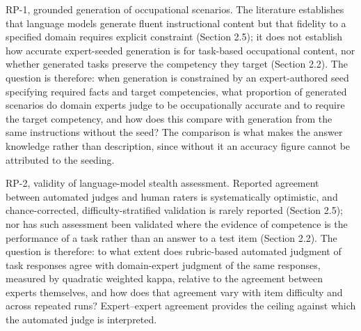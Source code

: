 RP-1, grounded generation of occupational scenarios. The literature establishes that language models generate fluent instructional content but that fidelity to a specified domain requires explicit constraint (Section 2.5); it does not establish how accurate expert-\allowbreak{}seeded generation is for task-based occupational content, nor whether generated tasks preserve the competency they target (Section 2.2). The question is therefore: when generation is constrained by an expert-\allowbreak{}authored seed specifying required facts and target competencies, what proportion of generated scenarios do domain experts judge to be occupationally accurate and to require the target competency, and how does this compare with generation from the same instructions without the seed? The comparison is what makes the answer knowledge rather than description, since without it an accuracy figure cannot be attributed to the seeding.

RP-2, validity of language-\allowbreak{}model stealth assessment. Reported agreement between automated judges and human raters is systematically optimistic, and chance-\allowbreak{}corrected, difficulty-\allowbreak{}stratified validation is rarely reported (Section 2.5); nor has such assessment been validated where the evidence of competence is the performance of a task rather than an answer to a test item (Section 2.2). The question is therefore: to what extent does rubric-\allowbreak{}based automated judgment of task responses agree with domain-\allowbreak{}expert judgment of the same responses, measured by quadratic weighted kappa, relative to the agreement between experts themselves, and how does that agreement vary with item difficulty and across repeated runs? Expert--expert agreement provides the ceiling against which the automated judge is interpreted.

